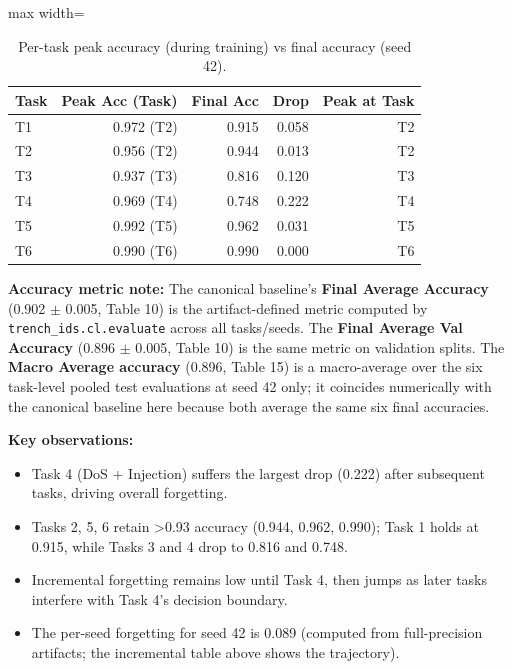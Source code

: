 \documentclass[11pt,a4paper]{article}
\begin{document}
\begin{table}[H]
\centering
\caption{Per-task peak accuracy (during training) vs final accuracy (seed 42).}
\label{tab:peak-vs-final}
\begin{adjustbox}{max width=\textwidth}
\begin{tabular}{lrrrr}
\toprule
Task & Peak Acc (Task) & Final Acc & Drop & Peak at Task \\
\midrule
T1 & 0.972 (T2) & 0.915 & 0.058 & T2 \\
T2 & 0.956 (T2) & 0.944 & 0.013 & T2 \\
T3 & 0.937 (T3) & 0.816 & 0.120 & T3 \\
T4 & 0.969 (T4) & 0.748 & 0.222 & T4 \\
T5 & 0.992 (T5) & 0.962 & 0.031 & T5 \\
T6 & 0.990 (T6) & 0.990 & 0.000 & T6 \\
\bottomrule
\end{tabular}
\end{adjustbox}
\end{table}

\textbf{Accuracy metric note:} The canonical baseline's \textbf{Final Average Accuracy} (\num{0.902} $\pm$ \num{0.005}, Table 10) is the artifact-defined metric computed by \texttt{trench\_ids.cl.evaluate} across all tasks/seeds. The \textbf{Final Average Val Accuracy} (\num{0.896} $\pm$ \num{0.005}, Table 10) is the same metric on validation splits. The \textbf{Macro Average accuracy} (\num{0.896}, Table 15) is a macro-average over the six task-level pooled test evaluations at seed 42 only; it coincides numerically with the canonical baseline here because both average the same six final accuracies.

\textbf{Key observations:}
\begin{itemize}[leftmargin=*]
\item Task 4 (DoS + Injection) suffers the largest drop (\num{0.222}) after subsequent tasks, driving overall forgetting.
\item Tasks 2, 5, 6 retain >\num{0.93} accuracy (0.944, 0.962, 0.990); Task 1 holds at 0.915, while Tasks 3 and 4 drop to 0.816 and 0.748.
\item Incremental forgetting remains low until Task 4, then jumps as later tasks interfere with Task 4's decision boundary.
\item The per-seed forgetting for seed 42 is \num{0.089} (computed from full-precision artifacts; the incremental table above shows the trajectory).
\end{itemize}
\end{document}
